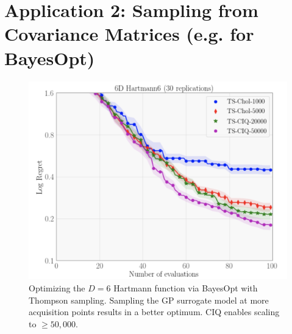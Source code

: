 \section{Application 2: Sampling from Covariance Matrices (e.g. for BayesOpt)}


\begin{figure}[t!]
  \centering
  \includegraphics[width=0.5\linewidth]{figures/hartmann6.png}
  \caption{
    Optimizing the $D=6$ Hartmann function via BayesOpt with Thompson sampling.
    Sampling the GP surrogate model at more acquisition points results in a better optimum.
    CIQ enables scaling to $\geq50,\!000$.
  }
  \label{fig:hartmann6}
\end{figure}
